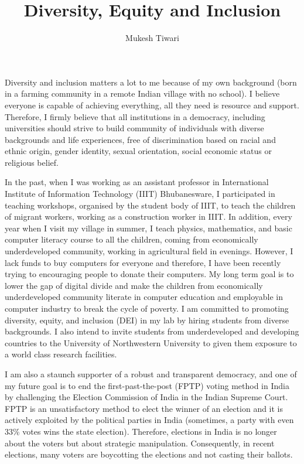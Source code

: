 \documentclass[a4paper]{article}
\title{Diversity, Equity and Inclusion}
\author{Mukesh Tiwari}
\date{}
\begin{document}
\fontsize{12}{15}
\selectfont
\maketitle

Diversity and inclusion matters a lot to me because of my own background (born in 
a farming community in a remote Indian village with no school). I believe everyone is capable of 
achieving everything, all they need is resource and support. Therefore,  I firmly believe that 
all institutions in a democracy, including universities should strive to build
community of individuals with diverse backgrounds and life experiences, 
free of discrimination based on racial and ethnic origin, gender identity, 
sexual orientation, social economic status or religious belief. 

\vspace{0.5cm}
In the past, when I was working as an assistant professor in International Institute of 
Information Technology (IIIT) Bhubanesware, I participated in teaching 
workshops, organised by the student body of IIIT, to teach the 
children of migrant workers, working as a construction worker in IIIT.
In addition, every year when I visit my village 
in summer, I teach physics, mathematics, and basic computer literacy course to 
all the children, coming from 
economically underdeveloped community, working in 
agricultural field in evenings. However, I lack funds to buy computers for everyone 
and therefore, I have been recently trying to encouraging people to donate 
their computers. My long term goal is to lower the gap of digital divide and make the 
children from economically underdeveloped community literate in computer education 
and employable in computer industry to break the cycle of poverty. 
I am committed to promoting diversity, equity, and inclusion (DEI) in my lab by 
hiring students from diverse backgrounds. I also intend to invite 
students from underdeveloped and developing countries to the University of 
Northwestern University to given them exposure to a world class research facilities. 



\vspace{0.5cm}
I am also a staunch supporter of a robust and transparent 
democracy, and one of my future goal is to end the 
first-past-the-post (FPTP) voting method in India by challenging the Election 
Commission of India in the Indian Supreme Court. FPTP is an unsatisfactory method 
to elect the winner of an election and it is actively exploited by 
the political parties in India (sometimes, a party with even 33\% votes 
wins the state election). Therefore, elections in India is no longer 
about the voters but about strategic manipulation. Consequently, 
in recent elections, many voters are boycotting the elections and 
not casting their ballots. 
\end{document}
